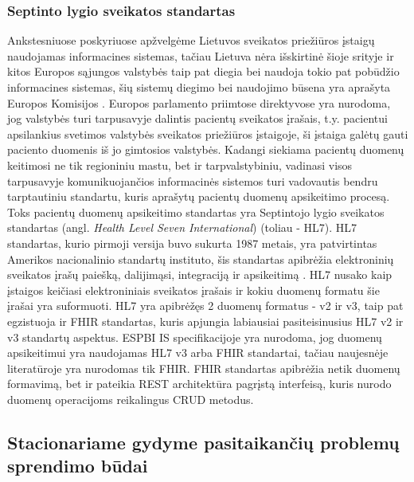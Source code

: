 \subsubsection{Septinto lygio sveikatos standartas}
Ankstesniuose poskyriuose apžvelgėme Lietuvos sveikatos priežiūros įstaigų naudojamas informacines sistemas, tačiau Lietuva nėra išskirtinė šioje srityje ir kitos Europos sąjungos valstybės taip pat diegia bei naudoja tokio pat pobūdžio informacines sistemas, šių sistemų diegimo bei naudojimo būsena yra aprašyta Europos Komisijos \cite{EuroposKomisija}. Europos parlamento priimtose direktyvose \cite{EuroposParlamentas} yra nurodoma, jog valstybės turi tarpusavyje dalintis pacientų sveikatos įrašais, t.y. pacientui apsilankius svetimos valstybės sveikatos priežiūros įstaigoje, ši įstaiga galėtų gauti paciento duomenis iš jo gimtosios valstybės. Kadangi siekiama pacientų duomenų keitimosi ne tik regioniniu mastu, bet ir tarpvalstybiniu, vadinasi visos tarpusavyje komunikuojančios informacinės sistemos turi vadovautis bendru tarptautiniu standartu, kuris aprašytų pacientų duomenų apsikeitimo procesą. Toks pacientų duomenų apsikeitimo standartas yra Septintojo lygio sveikatos standartas (angl. \textit{Health Level Seven International}) (toliau - HL7). HL7 standartas, kurio pirmoji versija buvo sukurta 1987 metais, yra patvirtintas Amerikos nacionalinio standartų instituto, šis standartas apibrėžia elektroninių sveikatos įrašų paiešką, dalijimąsi, integraciją ir apsikeitimą \cite{HL72009}. HL7 nusako kaip įstaigos keičiasi elektroniniais sveikatos įrašais ir kokiu duomenų formatu šie įrašai yra suformuoti. HL7 yra apibrėžęs 2 duomenų formatus - v2 ir v3, taip pat egzistuoja ir FHIR standartas, kuris apjungia labiausiai pasiteisinusius HL7 v2 ir v3 standartų aspektus. ESPBI IS specifikacijoje \cite{Specifikacija} yra nurodoma, jog duomenų apsikeitimui yra naudojamas HL7 v3 arba FHIR standartai, tačiau naujesnėje literatūroje \cite{Registrucentras} yra nurodomas tik FHIR. FHIR standartas apibrėžia netik duomenų formavimą, bet ir pateikia REST architektūra pagrįstą interfeisą, kuris nurodo
duomenų operacijoms reikalingus CRUD metodus.




\subsection{Stacionariame gydyme pasitaikančių problemų sprendimo būdai}

